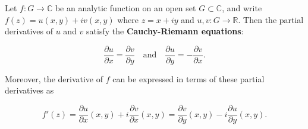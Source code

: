 Let $f : G \to \mathbb{C}$ be an analytic function on an open set $G \subset \mathbb{C}$, and write $f(z) = u(x, y) + i v(x, y)$ where $z = x + iy$ and $u, v : G \to \mathbb{R}$. Then the partial derivatives of $u$ and $v$ satisfy the \textbf{Cauchy-Riemann equations}:

$$\frac{\partial u}{\partial x} = \frac{\partial v}{\partial y} \quad \text{and} \quad \frac{\partial u}{\partial y} = -\frac{\partial v}{\partial x}.$$

Moreover, the derivative of $f$ can be expressed in terms of these partial derivatives as

$$f'(z) = \frac{\partial u}{\partial x}(x, y) + i \frac{\partial v}{\partial x}(x, y) = \frac{\partial v}{\partial y}(x, y) - i \frac{\partial u}{\partial y}(x, y).$$
